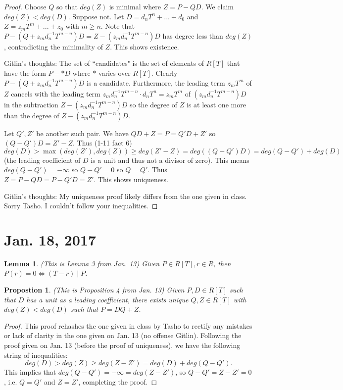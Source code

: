 \documentclass{amsart}
\newtheorem{lemma}[thm]{Lemma}
\newtheorem{prop}[thm]{Propostion}
\theoremstyle{definition}
\theoremstyle{remark}
\begin{document}
\begin{proof}\hspace{0.5cm}

Choose $Q$ so that $deg(Z)$ is minimal where $Z = P-QD$.  We claim $deg(Z) < deg(D)$.  Suppose not.  Let $D = d_nT^n + ... + d_0$ and $Z = z_mT^m + ... + z_0$ with $m \geq n$.  Note that $P-(Q+z_md_n^{-1}T^{m-n})D = Z - (z_md_n^{-1}T^{m-n})D$ has degree less than $deg(Z)$, contradicting the minimality of $Z$.  This shows existence.

Gitlin's thoughts:  The set of ``candidates" is the set of elements of $R[T]$ that have the form $P-*D$ where $*$ varies over $R[T]$.  Clearly $P-(Q+z_md_n^{-1}T^{m-n})D$ is a candidate.  Furthermore, the leading term $z_mT^m$ of $Z$ cancels with the leading term $z_md_n^{-1}T^{m-n} \cdot d_nT^n = z_mT^m$ of $(z_md_n^{-1}T^{m-n})D$ in the subtraction $Z - (z_md_n^{-1}T^{m-n})D$ so the degree of $Z$ is at least one more than the degree of $Z - (z_md_n^{-1}T^{m-n})D$.

Let $Q',Z'$ be another such pair.  We have $QD+Z = P = Q'D+Z'$ so $(Q-Q')D = Z'-Z$.  Thus (1-11 fact 6) $deg(D) > \max(deg(Z'),deg(Z)) \geq deg(Z'-Z) = deg((Q-Q')D) = deg(Q-Q') + deg(D)$ (the leading coefficient of $D$ is a unit and thus not a divisor of zero).  This means $deg(Q-Q') = - \infty$ so $Q-Q' = 0$ so $Q= Q'$.  Thus $Z = P-QD = P-Q'D = Z'$.  This shows uniqueness.

Gitlin's thoughts:  My uniqueness proof likely differs from the one given in class.  Sorry Tasho.  I couldn't follow your inequalities.

\end{proof}

\section{Jan. 18, 2017}
\begin{lemma}
(This is Lemma 3 from Jan. 13) Given $P \in R[T], r \in R$, then $P(r) = 0 \Leftrightarrow (T - r) \mid P$.
\end{lemma}

\begin{prop}
(This is Proposition 4 from Jan. 13) Given $P, D \in R[T]$ such that $D$ has a unit as a leading coefficient, there exists unique $Q, Z \in R[T]$ with $deg(Z) < deg(D)$ such that $P = DQ + Z$.
\end{prop}

\begin{proof}
This proof rehashes the one given in class by Tasho to rectify any mistakes or lack of clarity in the one given on Jan. 13 (no offense Gitlin). Following the proof given on Jan. 13 (before the proof of uniqueness), we have the following string of inequalities:
\[deg(D) > deg(Z) \geq deg(Z - Z') = deg(D) + deg(Q - Q').\]
This implies that $deg(Q - Q') = -\infty = deg(Z - Z')$, so $Q - Q' = Z - Z' = 0$, i.e. $Q = Q'$ and $Z = Z'$, completing the proof.
\end{proof}
\end{document}
